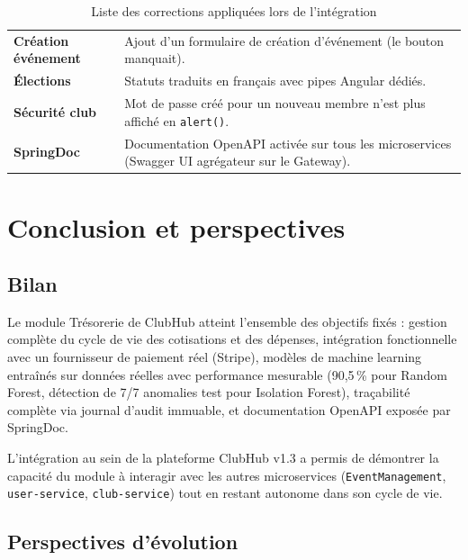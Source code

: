 \documentclass[11pt,a4paper]{article}
\begin{document}
\begin{table}[h]
\begin{tabularx}{\linewidth}{>{\bfseries}lX}
    Création événement & Ajout d'un formulaire de création d'événement (le bouton manquait). \\
    Élections         & Statuts traduits en français avec pipes Angular dédiés. \\
    Sécurité club     & Mot de passe créé pour un nouveau membre n'est plus affiché en \texttt{alert()}. \\
    SpringDoc         & Documentation OpenAPI activée sur tous les microservices (Swagger UI agrégateur sur le Gateway). \\
    \bottomrule
  \end{tabularx}
  \caption{Liste des corrections appliquées lors de l'intégration}
\end{table}

\section{Conclusion et perspectives}

\subsection{Bilan}

Le module Trésorerie de ClubHub atteint l'ensemble des objectifs fixés : gestion complète du cycle de vie des cotisations et des dépenses, intégration fonctionnelle avec un fournisseur de paiement réel (Stripe), modèles de machine learning entraînés sur données réelles avec performance mesurable (90{,}5\,\% pour Random Forest, détection de 7/7 anomalies test pour Isolation Forest), traçabilité complète via journal d'audit immuable, et documentation OpenAPI exposée par SpringDoc.

L'intégration au sein de la plateforme ClubHub v1.3 a permis de démontrer la capacité du module à interagir avec les autres microservices (\texttt{EventManagement}, \texttt{user-service}, \texttt{club-service}) tout en restant autonome dans son cycle de vie.

\subsection{Perspectives d'évolution}
\end{document}
